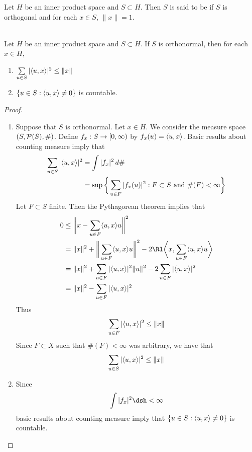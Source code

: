 \documentclass{book}
\begin{document}
\begin{defn} \ld{}
	Let $H$ be an inner product space and $S \subset H$. Then $S$ is said to be  if $S$ is orthogonal and for each $x \in S$, $\|x \| = 1$.
\end{defn}

\begin{ex} \lex{}\\
Let $H$ be an inner product space and $S \subset H$. If $S$ is orthonormal, then for each $x \in H$, 
\begin{enumerate}
	\item $\sum\limits_{u \in S} | \langle u, x \rangle |^2  \leq \|x\|$
	\item  $\{u \in S: \langle u, x\rangle \neq 0\}$ is countable.
\end{enumerate}
\end{ex}

\begin{proof}\
\begin{enumerate}
	\item Suppose that $S$ is orthonormal. Let $x \in H$. We consider the measure space $(S, \mathcal{P}(S), \#)$. Define $f_x: S \rightarrow [0,\infty)$ by $f_x(u) = \langle u, x\rangle $. Basic results about counting measure imply that
	\begin{align*}
		\sum_{u \in S} |\langle u, x\rangle |^2
		& = \int |f_x|^2 \, d\# \\
		& = \sup \bigg \{\sum_{u \in F} |f_x(u)|^2: F \subset S \text{ and } \#(F) < \infty \bigg\}
	\end{align*}
	Let $F \subset S$ finite. Then the Pythagorean theorem implies that  
	\begin{align*}
		0 
		& \leq \bigg \|x - \sum_{u \in F} \l u, x \r u \bigg \|^2 \\
		&= \|x\|^2 + \bigg \| \sum_{u \in F} \l u, x \r u \bigg \|^2 - 2 \Rl \bigg \l x, \sum_{u \in F} \l u, x \r u \bigg \r  \\
		&= \|x\|^2 +  \sum_{u \in F} |\l u, x \r|^2 \|u\|^2 - 2 \sum_{u \in F} | \l u, x \r|^2  \\
		&= \|x\|^2 -  \sum_{u \in F} |\l u, x \r|^2 
	\end{align*}
	Thus 
	$$\sum_{u \in F} | \langle u, x \rangle |^2  \leq \|x\|$$
	Since $F \subset X$ such that $\#(F) < \infty$ was arbitrary, we have that  
	$$\sum_{u \in S} | \langle u, x \rangle |^2  \leq \|x\|$$
	\item Since 
	$$\int |f_x|^2 \dsh < \infty$$
	basic results about counting measure imply that $\{u \in S: \langle u, x\rangle \neq 0\}$ is countable.
\end{enumerate}
\end{proof}
\end{document}
